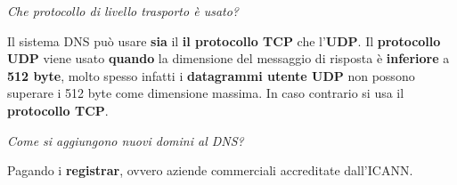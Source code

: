 \documentclass[11pt,a4paper,oneside]{book}
\theoremstyle{definition}
\begin{document}
\begin{flushleft}
	\textit{Che protocollo di livello trasporto è usato?}
\end{flushleft}
Il sistema DNS può usare \textbf{sia} il \textbf{il protocollo TCP} che l'\textbf{UDP}.
Il \textbf{protocollo UDP} viene usato \textbf{quando} la dimensione del messaggio di risposta è \textbf{inferiore} a\textbf{ 512 byte}, molto spesso infatti i \textbf{datagrammi utente UDP} non possono superare i 512 byte come dimensione massima. In caso contrario si usa il \textbf{protocollo TCP}.
\begin{flushleft}
	\textit{Come si aggiungono nuovi domini al DNS?}
\end{flushleft}
Pagando i \textbf{registrar}, ovvero aziende commerciali accreditate dall'ICANN.

\pagebreak
\end{document}
